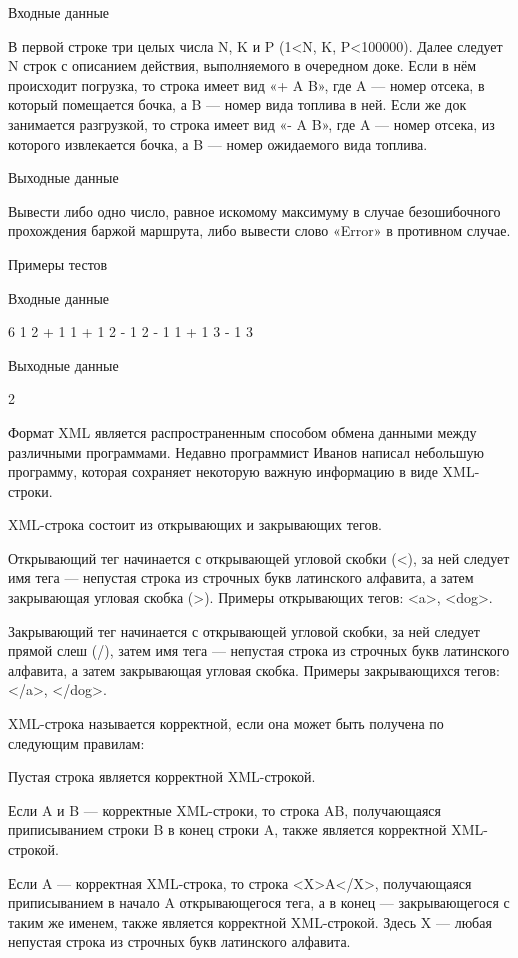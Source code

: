 \documentclass[]{article}
\begin{document}
Входные данные

В первой строке три целых числа N, K и P (1<N, K, P<100000). Далее следует N строк с описанием действия, выполняемого в очередном доке. Если в нём происходит погрузка, то строка имеет вид «+ A B», где A — номер отсека, в который помещается бочка, а B — номер вида топлива в ней. Если же док занимается разгрузкой, то строка имеет вид «- A B», где A — номер отсека, из которого извлекается бочка, а B — номер ожидаемого вида топлива.

Выходные данные

Вывести либо одно число, равное искомому максимуму в случае безошибочного прохождения баржой маршрута, либо вывести слово «Error» в противном случае.

Примеры тестов

Входные данные

6 1 2
+ 1 1
+ 1 2
- 1 2
- 1 1
+ 1 3
- 1 3

Выходные данные

2


 Формат XML является распространенным способом обмена данными между различными программами. Недавно программист Иванов написал небольшую программу, которая сохраняет некоторую важную информацию в виде XML-строки.

XML-строка состоит из открывающих и закрывающих тегов.

Открывающий тег начинается с открывающей угловой скобки (<), за ней следует имя тега — непустая строка из строчных букв латинского алфавита, а затем закрывающая угловая скобка (>). Примеры открывающих тегов: <a>, <dog>.

Закрывающий тег начинается с открывающей угловой скобки, за ней следует прямой слеш (/), затем имя тега — непустая строка из строчных букв латинского алфавита, а затем закрывающая угловая скобка. Примеры закрывающихся тегов: </a>, </dog>.

XML-строка называется корректной, если она может быть получена по следующим правилам:

    Пустая строка является корректной XML-строкой.

    Если A и B — корректные XML-строки, то строка AB, получающаяся приписыванием строки B в конец строки A, также является корректной XML-строкой.

    Если A — корректная XML-строка, то строка <X>A</X>, получающаяся приписыванием в начало A открывающегося тега, а в конец — закрывающегося с таким же именем, также является корректной XML-строкой. Здесь X — любая непустая строка из строчных букв латинского алфавита.
\end{document}
